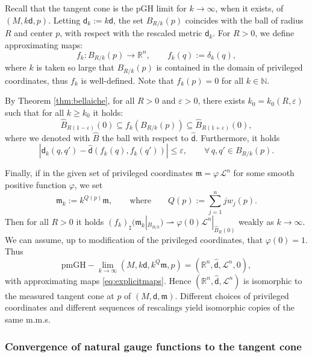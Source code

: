 \documentclass[11pt,a4paper]{article}
\theoremstyle{plain}
\theoremstyle{definition}
\theoremstyle{remark}
\numberwithin{equation}{section}
\newcommand{\R}{\mathbb{R}} %
\newcommand{\N}{\mathbb{N}} %
\newcommand{\mm}{\mathfrak m}
\newcommand{\sfd}{\mathsf d}
\begin{document}
Recall that the tangent cone is the pGH limit for $k\to \infty$, when it exists, of $(M,k\sfd,p)$. Letting $\sfd_k := k \sfd$, the set $B_{R/k}(p)$ coincides with the ball of radius $R$ and center $p$, with respect with the rescaled metric $\sfd_k$. For $R>0$, we define approximating maps:
\begin{equation}\label{eq:explicitmaps}
f_k : B_{R/k}(p) \to \R^n,\qquad f_k(q) := \delta_k(q),
\end{equation}
where $k$ is taken so large that $B_{R/k}(p)$ is contained in the domain of privileged coordinates, thus $f_k$ is well-defined. Note that $f_k(p) = 0$ for all $k\in \N$. 

By Theorem \ref{thm:bellaiche}, for all $R>0$ and $\varepsilon>0$, there exists $k_0=k_0(R,\varepsilon)$ such that for all $k\geq k_0$ it holds:
\begin{equation}\label{eq:ballscontained}
\hat{B}_{R(1-\varepsilon)}(0) \subseteq f_k(B_{R/k}(p)) \subseteq \hat{B}_{R(1+\varepsilon)}(0),
\end{equation}
where we denoted with $\hat{B}$ the ball with respect to $\hat{\sfd}$. Furthermore, it holds
\begin{equation}
|\sfd_k(q,q') - \hat{\sfd}(f_k(q),f_k(q'))| \leq \varepsilon,\qquad \forall\, q,q'\in B_{R/k}(p).
\end{equation}

Finally, if in the given set of privileged coordinates $\mm = \varphi\,\mathscr{L}^n$ for some smooth positive function $\varphi$, we set
\begin{equation}
\mm_k:=k^{Q(p)}\mm, \qquad \text{where} \qquad Q(p):=\sum_{j=1}^n j w_j(p).
\end{equation}
Then for all $R>0$ it holds $(f_k)_\sharp(\mm_k|_{B_{R/k}}) \rightharpoonup  \varphi(0)\mathscr{L}^n|_{\hat{B}_R(0)}$ weakly as $k\to \infty$. We can assume, up to modification of the privileged coordinates, that $\varphi(0)=1$. Thus
\begin{equation}
\text{pmGH}-\lim_{k\to \infty}(M,k\sfd,k^Q\mm,p) = (\R^n,\hat{\sfd},\mathscr{L}^n,0),
\end{equation}
with approximating maps \eqref{eq:explicitmaps}. Hence $(\R^n,\hat{\sfd},\mathscr{L}^n)$ is isomorphic to the measured tangent cone at $p$ of $(M,\sfd,\mm)$. Different choices of privileged coordinates and different sequences of rescalings yield isomorphic copies of the same m.m.s.

\subsubsection{Convergence of natural gauge functions to the tangent cone}
\end{document}
